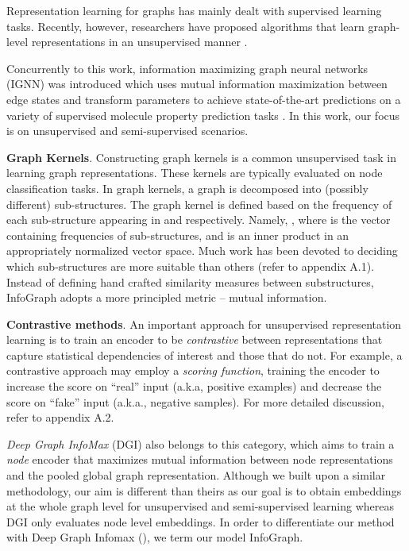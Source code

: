 \documentclass{article} \usepackage{iclr2020_conference,times}
\newcommand{\xhdr}[1]{{\noindent\bfseries #1}.}
\def\method{InfoGraph}
\begin{document}
Representation learning for graphs has mainly dealt with supervised learning tasks. Recently, however, researchers have proposed algorithms that learn graph-level representations in an unsupervised manner \cite{narayanan2017graph2vec,sub2vec}.

Concurrently to this work, information maximizing graph neural networks (IGNN) was introduced which uses mutual information maximization between edge states and transform parameters to achieve state-of-the-art predictions on a variety of supervised molecule property prediction tasks \cite{chen2019utilizing}. In this work, our focus is on unsupervised and semi-supervised scenarios. 

\xhdr{Graph Kernels}
Constructing graph kernels is a common unsupervised task in learning graph representations. These kernels are typically evaluated on node classification tasks. In graph kernels, a graph  is decomposed into (possibly different)  sub-structures. The graph kernel   is defined based on the frequency of each sub-structure appearing in  and  respectively. Namely, , where  is the vector containing  frequencies of   sub-structures, and  is an inner product in an appropriately normalized vector space. Much work has been devoted to deciding which sub-structures are more suitable than others (refer to appendix A.1). Instead of defining hand crafted similarity measures between substructures, \method{} adopts a more principled metric -- mutual information.

\xhdr{Contrastive methods}
An important approach for unsupervised  representation learning  is to train an encoder to be \emph{contrastive} between representations that capture statistical dependencies of interest and those that do not. For example, a contrastive approach may employ a \emph{scoring function}, training the encoder to increase the score on ``real'' input (a.k.a, positive examples) and decrease the score on ``fake'' input (a.k.a., negative samples). For more detailed discussion, refer to appendix A.2.

\textit{Deep Graph InfoMax} (DGI) \cite{velivckovic2018deep} also belongs to this category, which aims to train a \emph{node} encoder that maximizes mutual information between node representations and the pooled global graph representation. Although we built upon a similar methodology, our aim is different than theirs as our goal is to obtain embeddings at the whole graph level for unsupervised and semi-supervised learning whereas DGI only evaluates node level embeddings. In order to differentiate our method with Deep Graph Infomax (\cite{velivckovic2018deep}), we term our model \method{}.
\end{document}
